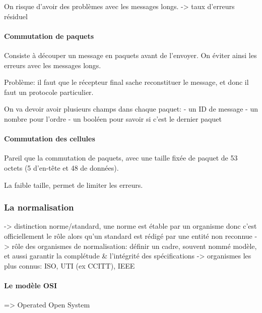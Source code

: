 On risque d'avoir des problèmes avec les messages longs. -\textgreater{}
taux d'erreurs résiduel

\hypertarget{commutation-de-paquets}{%
\paragraph{Commutation de paquets}\label{commutation-de-paquets}}

Consiste à découper un message en paquets avant de l'envoyer. On éviter
ainsi les erreurs avec les messages longs.

Problème: il faut que le récepteur final sache reconstituer le message,
et donc il faut un protocole particulier.

On va devoir avoir plusieurs champs dans chaque paquet: - un ID de
message - un nombre pour l'ordre - un booléen pour savoir si c'est le
dernier paquet

\hypertarget{commutation-des-cellules}{%
\paragraph{Commutation des cellules}\label{commutation-des-cellules}}

Pareil que la commutation de paquets, avec une taille fixée de paquet de
53 octets (5 d'en-tête et 48 de données).

La faible taille, permet de limiter les erreurs.

\hypertarget{la-normalisation}{%
\subsubsection{La normalisation}\label{la-normalisation}}

-\textgreater{} distinction norme/standard, une norme est étable par un
organisme donc c'est officiellement le rôle alors qu'un standard est
rédigé par une entité non reconnue -\textgreater{} rôle des organismes
de normalisation: définir un cadre, souvent nommé modèle, et aussi
garantir la complétude \& l'intégrité des spécifications -\textgreater{}
organismes les plus connus: ISO, UTI (ex CCITT), IEEE

\hypertarget{le-moduxe8le-osi}{%
\paragraph{Le modèle OSI}\label{le-moduxe8le-osi}}

=\textgreater{} Operated Open System

